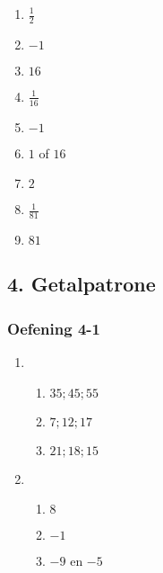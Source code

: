{\begin{multicols}{3}
\begin{enumerate}[label=\textbf{\arabic*}., noitemsep]
\begin{enumerate}[label=\textbf{(\alph*)}, itemsep=1pt]
    \item $\frac{1}{2}$%
    \item $-1$%
    \item $16$%
    \item $\frac{1}{16}$%
    \item $-1$%
    \item $1$ of $16$%
    \item $2$%
    \item $\frac{1}{81}$%
    \item $81$%
    \end{enumerate}
  \end{enumerate}
\end{multicols}


\subsection* {4. Getalpatrone}
\begin{multicols}{3}
\subsubsection*{Oefening 4-1} %

\begin{enumerate}[noitemsep, label=\textbf{\arabic*}. ] 
\item %

  \begin{enumerate} [noitemsep, label=\textbf{(\alph*)} ]
  \item $35; 45; 55$ %
  \item $7; 12; 17$%
  \item $21; 18; 15$%
  \end{enumerate}
 \item %
  \begin{enumerate} [noitemsep, label=\textbf{(\alph*)} ]
  \item $8$%
  \item $-1$%
  \item $-9$ en $-5$%
  \end{enumerate}
     

\end{enumerate}
\end{multicols}}
